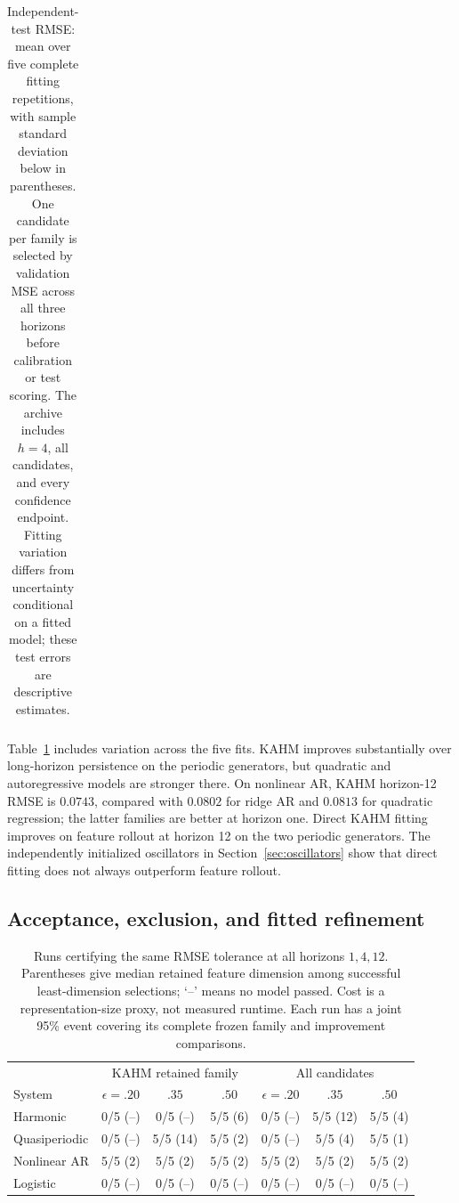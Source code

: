 \begin{table}[t]
\begin{tabular}{lrrrrrrrr}
\bottomrule
\end{tabular}
\caption{Independent-test RMSE: mean over five complete fitting repetitions, with sample standard deviation below in parentheses. One candidate per family is selected by validation MSE across all three horizons before calibration or test scoring. The archive includes $h=4$, all candidates, and every confidence endpoint. Fitting variation differs from uncertainty conditional on a fitted model; these test errors are descriptive estimates.}
\label{tab:forecast}
\end{table}


Table~\ref{tab:forecast} includes variation across the five fits. KAHM improves
substantially over long-horizon persistence on the periodic generators, but
quadratic and autoregressive models are stronger there. On nonlinear AR,
KAHM horizon-12 RMSE is $0.0743$, compared with $0.0802$ for ridge AR and
$0.0813$ for quadratic regression; the latter families are better at horizon
one. Direct KAHM fitting improves on feature rollout at horizon 12 on the two
periodic generators. The independently initialized oscillators in Section~\ref{sec:oscillators}
show that direct fitting does not always outperform feature rollout.

\subsection{Acceptance, exclusion, and fitted refinement}

\begin{table}[t]
\centering\small
\begin{tabular}{lcccccc}
\toprule
& \multicolumn{3}{c}{KAHM retained family} & \multicolumn{3}{c}{All candidates}\\
System & $\epsilon=.20$ & $.35$ & $.50$ & $\epsilon=.20$ & $.35$ & $.50$\\
\midrule
Harmonic & 0/5 (--) & 0/5 (--) & 5/5 (6) & 0/5 (--) & 5/5 (12) & 5/5 (4)\\
Quasiperiodic & 0/5 (--) & 5/5 (14) & 5/5 (2) & 0/5 (--) & 5/5 (4) & 5/5 (1)\\
Nonlinear AR & 5/5 (2) & 5/5 (2) & 5/5 (2) & 5/5 (2) & 5/5 (2) & 5/5 (2)\\
Logistic & 0/5 (--) & 0/5 (--) & 0/5 (--) & 0/5 (--) & 0/5 (--) & 0/5 (--)\\
\bottomrule
\end{tabular}
\caption{Runs certifying the same RMSE tolerance at all horizons $1,4,12$. Parentheses give median retained feature dimension among successful least-dimension selections; `--' means no model passed. Cost is a representation-size proxy, not measured runtime. Each run has a joint 95\% event covering its complete frozen family and improvement comparisons.}
\label{tab:selection}
\end{table}


